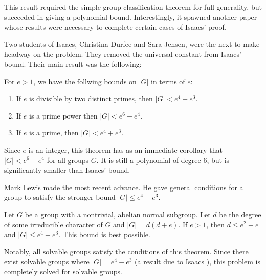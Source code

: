 \documentclass[main.tex]{subfiles}
\begin{document}
\hss

This result required the simple group classification theorem for full generality, but succeeded in giving a polynomial bound. Interestingly, it spawned another paper \cite{larsenmalletieparticle} whose results were necessary to complete certain cases of Isaacs' proof.

Two students of Isaacs, Christina Durfee and Sara Jensen, were the next to make headway on the problem. They removed the universal constant from Isaacs' bound. Their main result was the following:

\hss

\begin{theorem}
For $e > 1$, we have the follwing bounds on $|G|$ in terms of $e$:
\begin{enumerate}
	\item If $e$ is divisible by two distinct primes, then $|G| < e^4 + e^3$.
	\item If $e$ is a prime power then $|G| < e^6 - e^4$.
	\item If $e$ is a prime, then $|G| < e^4 + e^3$.
\end{enumerate}
\end{theorem}

\hss

\noindent Since $e$ is an integer, this theorem has as an immediate corollary that $|G| < e^6 - e^4$ for all groups $G$. It is still a polynomial of degree 6, but is significantly smaller than Isaacs' bound.

Mark Lewis made the most recent advance. He gave general conditions \cite{lewisarticle} for a group to satisfy the stronger bound $|G| \le e^4 - e^3$.

\hss

\begin{theorem} Let $G$ be a group with a nontrivial, abelian normal subgroup. Let $d$ be the degree of some irreducible character of $G$ and $|G| = d(d+e)$. If $e > 1$, then $d \le e^2 - e$ and $|G| \le e^4 - e^3$. This bound is best possible.
\end{theorem}

\hss

\noindent Notably, all solvable groups satisfy the conditions of this theorem. Since there exist solvable groups where $|G| = e^4 - e^3$ (a result due to Isaacs \cite{isaacsarticle}), this problem is completely solved for solvable groups. 

\hss
\end{document}
